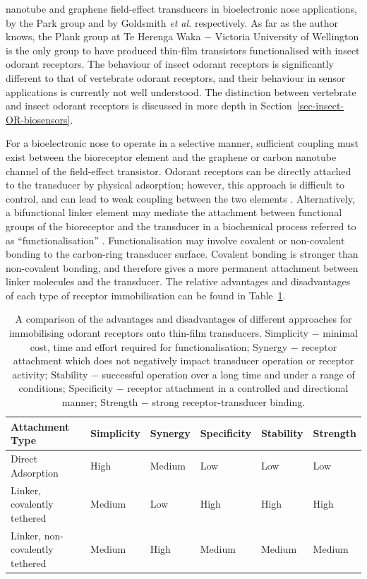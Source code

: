 \documentclass[
  a4paper,
]{scrbook}
\begin{document}
nanotube and graphene field-effect transducers in bioelectronic nose
applications, by the Park group and by Goldsmith \emph{et al.}
respectively. As far as the author knows, the Plank group at Te Herenga
Waka \(-\) Victoria University of Wellington is the only group to have
produced thin-film transistors functionalised with insect odorant
receptors. The behaviour of insect odorant receptors is significantly
different to that of vertebrate odorant receptors, and their behaviour
in sensor applications is currently not well understood. The distinction
between vertebrate and insect odorant receptors is discussed in more
depth in Section~\ref{sec-insect-OR-biosensors}.

For a bioelectronic nose to operate in a selective manner, sufficient
coupling must exist between the bioreceptor element and the graphene or
carbon nanotube channel of the field-effect transistor. Odorant
receptors can be directly attached to the transducer by physical
adsorption; however, this approach is difficult to control, and can lead
to weak coupling between the two elements
\autocite{Kwon2015,Dung2018,Bohbot2020}. Alternatively, a bifunctional
linker element may mediate the attachment between functional groups of
the bioreceptor and the transducer in a biochemical process referred to
as ``functionalisation'' \autocite{Star2003a}. Functionalisation may
involve covalent or non-covalent bonding to the carbon-ring transducer
surface. Covalent bonding is stronger than non-covalent bonding, and
therefore gives a more permanent attachment between linker molecules and
the transducer. The relative advantages and disadvantages of each type
of receptor immobilisation can be found in
Table~\ref{tbl-functionalisation-types}.

\hypertarget{tbl-functionalisation-types}{}
\begin{longtable}[t]{>{\raggedright\arraybackslash}p{5.4cm}>{\raggedright\arraybackslash}p{1.45cm}>{\raggedright\arraybackslash}p{1.3cm}>{\raggedright\arraybackslash}p{1.45cm}>{\raggedright\arraybackslash}p{1.3cm}>{\raggedright\arraybackslash}p{1.3cm}}
\caption{\label{tbl-functionalisation-types}A comparison of the advantages and disadvantages of different approaches
for immobilising odorant receptors onto thin-film transducers.
Simplicity − minimal cost, time and effort required for
functionalisation; Synergy − receptor attachment which does not
negatively impact transducer operation or receptor activity; Stability −
successful operation over a long time and under a range of conditions;
Specificity − receptor attachment in a controlled and directional
manner; Strength − strong receptor-transducer binding. }\tabularnewline

\toprule
Attachment Type & Simplicity & Synergy & Specificity & Stability & Strength\\
\midrule
Direct Adsorption & High & Medium & Low & Low & Low\\
Linker, covalently tethered & Medium & Low & High & High & High\\
Linker, non-covalently tethered & Medium & High & Medium & Medium & Medium\\
\bottomrule
\end{longtable}
\end{document}
